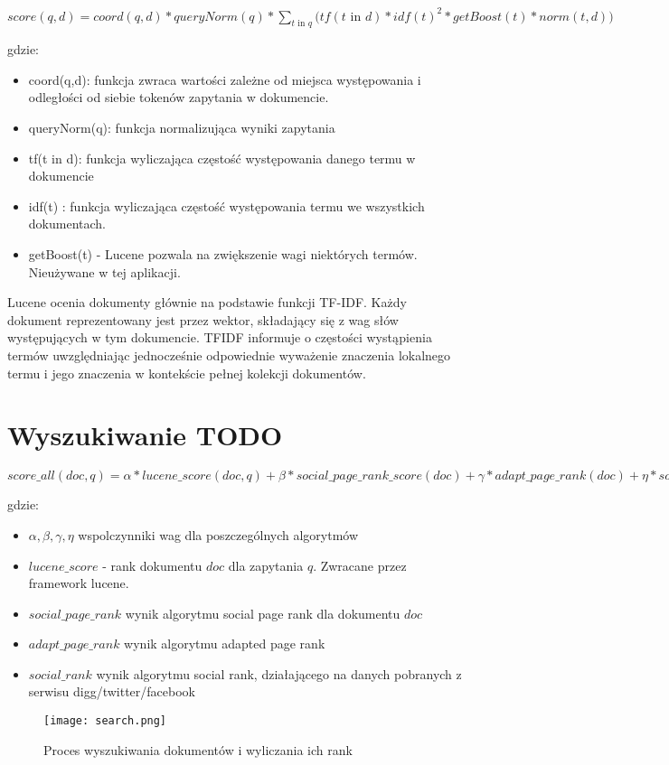 $score(q,d) =   coord(q,d)  *  queryNorm(q) * \sum_{t \text{ in } q}  \bigg( tf(t\text{ in } d)  *  idf(t)^2  *  getBoost(t) *  norm(t,d) )$

gdzie:
\begin{itemize}
	\item coord(q,d): funkcja zwraca wartości zależne od miejsca występowania i odległości od siebie tokenów zapytania w dokumencie.
	\item queryNorm(q): funkcja normalizująca wyniki zapytania
	\item tf(t in d): funkcja wyliczająca częstość występowania danego termu w dokumencie
	\item idf(t) : funkcja wyliczająca częstość występowania termu we wszystkich dokumentach.
	\item getBoost(t) - Lucene pozwala na zwiększenie wagi niektórych termów. Nieużywane w tej aplikacji.
\end{itemize}

Lucene ocenia dokumenty głównie na podstawie funkcji TF-IDF. Każdy dokument reprezentowany jest przez wektor, składający się z wag słów występujących w tym dokumencie. TFIDF informuje o częstości wystąpienia termów uwzględniając jednocześnie odpowiednie wyważenie znaczenia lokalnego termu i jego znaczenia w kontekście pełnej kolekcji dokumentów.

\section{Wyszukiwanie TODO}

$score\_all(doc, q) = \alpha * lucene\_score(doc, q) + \beta * social\_page\_rank\_score(doc) + \gamma * adapt\_page\_rank(doc) + \eta * social\_rank(doc)$

gdzie:

\begin{itemize}
\item $\alpha, \beta, \gamma, \eta$ wspolczynniki wag dla poszczególnych algorytmów
\item $lucene\_score$ - rank dokumentu $doc$ dla zapytania $q$. Zwracane przez framework lucene.
\item $social\_page\_rank$ wynik algorytmu social page rank dla dokumentu $doc$
\item $adapt\_page\_rank$ wynik algorytmu adapted page rank
\item $social\_rank$ wynik algorytmu social rank, działającego na danych pobranych z serwisu digg/twitter/facebook
\end{itemize}

\begin{figure}[htb]

\texttt{[image: search.png]}
\caption{Proces wyszukiwania dokumentów i wyliczania ich rank}
\label{fig:search_fig}
\end{figure}

